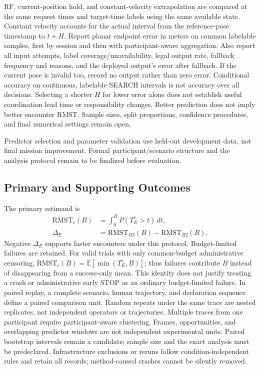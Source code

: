 \documentclass[conference]{IEEEtran}
\begin{document}
RF, current-position hold, and constant-velocity extrapolation are compared at the same request times and target-time labels using the same available state. Constant velocity accounts for the actual interval from the reference-pose timestamp to $t+H$. Report planar endpoint error in meters on common labelable samples, first by session and then with participant-aware aggregation. Also report all input attempts, label coverage/unavailability, legal output rate, fallback frequency and reasons, and the deployed output's error after fallback. If the current pose is invalid too, record no output rather than zero error. Conditional accuracy on continuous, labelable SEARCH intervals is not accuracy over all decisions. Selecting a shorter $H$ for lower error alone does not establish useful coordination lead time or responsibility changes. Better prediction does not imply better encounter RMST. Sample sizes, split proportions, confidence procedures, and final numerical settings remain open.

Predictor selection and parameter validation use held-out development data, not final mission improvement. Formal participant/scenario structure and the analysis protocol remain to be finalized before evaluation.

\subsection{Primary and Supporting Outcomes}
The primary estimand is
\begin{align}
 \mathrm{RMST}_c(B)&=\int_0^B P(T_E^c>t)\,dt,\\
 \Delta_E&=\mathrm{RMST}_{B3}(B)-\mathrm{RMST}_{B2}(B).
\end{align}
Negative $\Delta_E$ supports faster encounters under this protocol. Budget-limited failures are retained. For valid trials with only common-budget administrative censoring, $\mathrm{RMST}_c(B)=\mathbb E[\min(T_E^c,B)]$; thus failures contribute $B$ instead of disappearing from a success-only mean. This identity does not justify treating a crash or administrative early STOP as an ordinary budget-limited failure. In paired replay, a complete scenario, human trajectory, and declaration sequence define a paired comparison unit. Random repeats under the same trace are nested replicates, not independent operators or trajectories. Multiple traces from one participant require participant-aware clustering. Frames, opportunities, and overlapping predictor windows are not independent experimental units. Paired bootstrap intervals remain a candidate; sample size and the exact analysis must be predeclared. Infrastructure exclusions or reruns follow condition-independent rules and retain all records; method-caused crashes cannot be silently removed.
\end{document}
